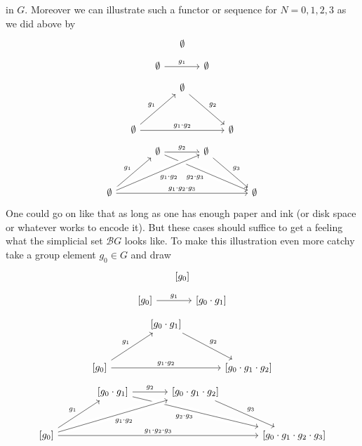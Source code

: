 in $G$. Moreover we can illustrate such a functor or sequence for $N = 0,1,2,3$ as we did above by
\[
\begin{tikzcd}[sep=large]
  \emptyset
\end{tikzcd}
\]
\[
\begin{tikzcd}[sep=large]
  \emptyset
  \arrow{r}{g_{1}}
  &
  \emptyset
\end{tikzcd}
\]
\[
\begin{tikzcd}[sep=large]
  &
  \emptyset
  \arrow{rd}{g_{2}}
  &
  \\
  \emptyset
  \arrow{ru}{g_{1}}
  \arrow{rr}{g_{1} \cdot g_{2}}
  &
  &
  \emptyset
\end{tikzcd}
\]
\[
\begin{tikzcd}[sep=large]
  &
  \emptyset
  \arrow{r}{g_{2}}
  \arrow[swap,crossing over]{rrd}{g_{2} \cdot g_{3}}
  &
  \emptyset
  \arrow{rd}{g_{3}}
  &
  \\
  \emptyset
  \arrow{ru}{g_{1}}
  \arrow[swap,crossing over]{rru}{g_{1} \cdot g_{2}}
  \arrow{rrr}{g_{1} \cdot g_{2} \cdot g_{3}}
  &
  &
  &
  \emptyset
\end{tikzcd}
\]
One could go on like that as long as one has enough paper and ink (or disk space or whatever works to encode it). But these cases should suffice to get a feeling what the simplicial set $\mathcal{B}G$ looks like. To make this illustration even more catchy take a group element $g_{0} \in G$ and draw
\[
\begin{tikzcd}[sep=large]
  \left[
    g_{0}
  \right]
\end{tikzcd}
\]
\[
\begin{tikzcd}[sep=large]
  \left[
    g_{0}
  \right]
  \arrow{r}{g_{1}}
  &
  \left[
    g_{0}
    \cdot
    g_{1}
  \right]
\end{tikzcd}
\]
\[
\begin{tikzcd}[sep=large]
  &
  \left[
    g_{0}
    \cdot
    g_{1}
  \right]
  \arrow{rd}{g_{2}}
  &
  \\
  \left[
    g_{0}
  \right]
  \arrow{ru}{g_{1}}
  \arrow{rr}{g_{1} \cdot g_{2}}
  &
  &
  \left[
    g_{0}
    \cdot
    g_{1}
    \cdot
    g_{2}
  \right]
\end{tikzcd}
\]
\[
\begin{tikzcd}[sep=large]
  &
  \left[
    g_{0}
    \cdot
    g_{1}
  \right]
  \arrow{r}{g_{2}}
  \arrow[swap,crossing over]{rrd}{g_{2} \cdot g_{3}}
  &
  \left[
    g_{0}
    \cdot
    g_{1}
    \cdot
    g_{2}
  \right]
  \arrow{rd}{g_{3}}
  &
  \\
  \left[
    g_{0}
    \right]
  \arrow{ru}{g_{1}}
  \arrow[swap,crossing over]{rru}{g_{1} \cdot g_{2}}
  \arrow{rrr}{g_{1} \cdot g_{2} \cdot g_{3}}
  &
  &
  &
  \left[
    g_{0}
    \cdot
    g_{1}
    \cdot
    g_{2}
    \cdot
    g_{3}
  \right]
\end{tikzcd}
\]

